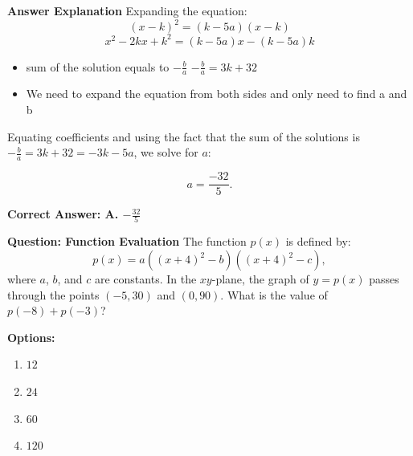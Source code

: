 \documentclass{beamer}
\begin{document}
\begin{frame}{\textbf{Answer Explanation}}
    Expanding the equation:
    \[
    (x - k)^2 = (k - 5a)(x - k)
    \]
    \[
    x^2 - 2kx + k^2 = (k - 5a)x - (k - 5a)k
    \]

\begin{itemize}
    \item sum of the solution equals to $-\frac{b}{a}$ \rightarrow \(-\frac{b}{a} = 3k + 32\)
    \item We need to expand the equation from both sides and only need to find a and b 
\end{itemize}


    
    Equating coefficients and using the fact that the sum of the solutions is \(-\frac{b}{a} = 3k + 32=-3k-5a\), we solve for \(a\):

    \[
    a = \frac{-32}{5}.
    \]

    \textbf{Correct Answer: A. \(-\frac{32}{5}\)}
\end{frame}
\begin{frame}{\textbf{Question: Function Evaluation}}
    The function \(p(x)\) is defined by:
    \[
    p(x) = a \left((x + 4)^2 - b\right)\left((x + 4)^2 - c\right),
    \]
    where \(a\), \(b\), and \(c\) are constants. In the \(xy\)-plane, the graph of \(y = p(x)\) passes through the points \((-5, 30)\) and \((0, 90)\). What is the value of \(p(-8) + p(-3)\)?

    \textbf{Options:}
    \begin{enumerate}
        \item[A] \(12\)
        \item[B] \(24\)
        \item[C] \(60\)
        \item[D] \(120\)
    \end{enumerate}
\end{frame}
\end{document}
